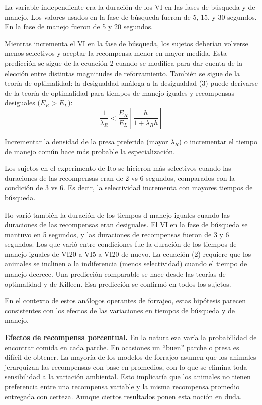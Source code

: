 \documentclass[a4paper,12pt]{article}
\begin{document}
La variable independiente era la duración de los VI en las fases de búsqueda y de manejo. Los valores usados en la fase de búsqueda fueron de 5, 15, y 30 segundos. En la fase de manejo fueron de 5 y 20 segundos. 

Mientras incrementa el VI en la fase de búsqueda, los sujetos deberían volverse menos selectivos y aceptar la recompensa menor en mayor medida. Esta predicción se sigue de la ecuación 2 cuando se modifica para dar cuenta de la elección entre distintas magnitudes de reforzamiento. También se sigue de la teoría de optimalidad: la desigualdad análoga a la desigualdad (3) puede derivarse de la teoría de optimalidad para tiempos de manejo iguales y recompensas desiguales ($E_{R}>E_{L}$):
\begin{equation}
	\frac{
	1
	}{
	\lambda_{R}
	}
	<
	\frac{
	E_{R}
	}{
	E_{L}
	}
	\left[
		\frac{
		h
		}{
		1 + \lambda_{R}h
		}
	\right]
\end{equation}

Incrementar la densidad de la presa preferida (mayor $\lambda_{R}$) o incrementar el tiempo de manejo común hace más probable la especialización.

Los sujetos en el experimento de Ito se hicieron más selectivos cuando las duraciones de las recompensas eran de 2 vs 6 segundos, comparados con la condición de 3 vs 6. Es decir, la selectividad incrementa con mayores tiempos de búsqueda.

Ito varió también la duración de los tiempos d manejo iguales cuando las duraciones de las recompensas eran desiguales. El VI en la fase de búsqueda se mantuvo en 5 segundos, y las duraciones de recompensas fueron de 3 y 6 segundos. Los que varió entre condiciones fue la duración de los tiempos de manejo iguales de VI20 a VI5 a VI20 de nuevo. La ecuación (2) requiere que los animales se inclinen a la indiferencia (menos selectividad) cuando el tiempo de manejo decrece. Una predicción comparable se hace desde las teorías de optimalidad y de Killeen. Esa predicción se confirmó en todos los sujetos.

En el contexto de estos análogos operantes de forrajeo, estas hipótesis parecen consistentes con los efectos de las variaciones en tiempos de búsqueda y de manejo.

{\bfseries Efectos de recompensa porcentual.} En la naturaleza varía la probabilidad de encontrar comida en cada parche. En ocasiones un ``buen'' parche o presa es difícil de obtener. La mayoría de los modelos de forrajeo asumen que los animales jerarquizan las recompensas con base en promedios, con lo que se elimina toda sensibilidad a la variación ambiental. Esto implicaría que los animales no tienen preferencia entre una recompensa variable y la misma recompensa promedio entregada con certeza. Aunque ciertos resultados ponen esta noción en duda.
\end{document}
